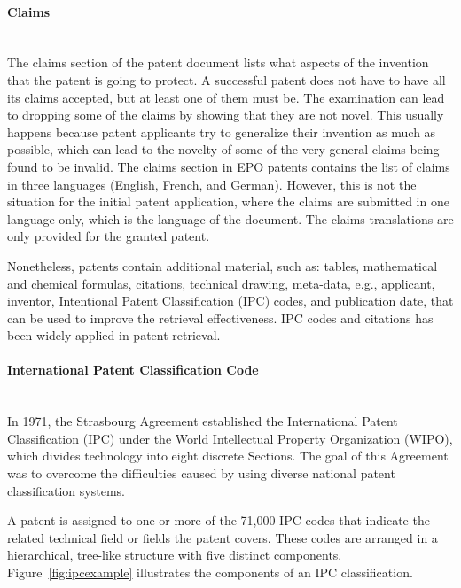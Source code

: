 \paragraph{Claims}
\ \\ 
The claims section of the patent document lists what aspects of the invention that the patent is
going to protect. A successful patent does not have to have all its claims accepted, but at least one
of them must be. The examination can lead to dropping some of the claims by showing that they
are not novel. This usually happens because patent applicants try to generalize their invention as
much as possible, which can lead to the novelty of some of the very general claims being found to
be invalid.
The claims section in EPO patents contains the list of claims in three languages (English,
French, and German). However, this is not the situation for the initial patent application, where
the claims are submitted in one language only, which is the language of the document. The
claims translations are only provided for the granted patent.

Nonetheless, patents contain
additional material, such as: tables, mathematical and chemical formulas, citations,
technical drawing, meta-data, e.g., applicant, inventor, Intentional Patent Classification 
(IPC) codes, and publication date, that can be used to improve the retrieval effectiveness.
IPC codes and citations has been widely applied in patent retrieval. 
\paragraph{International Patent Classification Code}
\ \\ 
In 1971, the Strasbourg Agreement established the International Patent Classification (IPC) under the World Intellectual Property Organization (WIPO), which divides technology into eight discrete Sections. The goal of this
Agreement was to overcome the difficulties caused by using diverse national patent classification systems.~\citep{harris2010comparison}

A patent is assigned to one or more of the 71,000 IPC codes that 
indicate the related technical field or fields the patent covers. 
These codes are arranged in a hierarchical, tree-like structure with 
five distinct components. Figure~\ref{fig:ipcexample} illustrates the components of an IPC classification.

